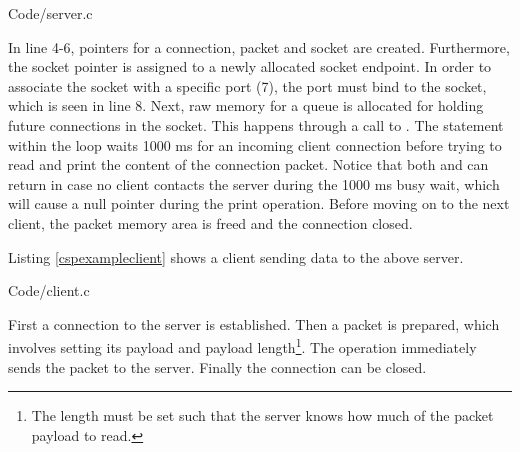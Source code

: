 
{Code/server.c}

In line 4-6, pointers for a connection, packet and socket are created. Furthermore, the socket pointer is assigned to a newly allocated socket endpoint. In order to associate the socket with a specific port (7), the port must bind to the socket, which is seen in line 8. Next, raw memory for a queue is allocated for holding future connections in the socket. This happens through a call to . The  statement within the loop waits 1000 ms for an incoming client connection before trying to read and print the content of the connection packet. Notice that both  and  can return  in case no client contacts the server during the 1000 ms busy wait, which will cause a null pointer during the print operation. Before moving on to the next client, the packet memory area is freed and the connection closed. 

Listing \ref{cspexampleclient} shows a client sending data to the above server.


{Code/client.c}

First a connection to the server is established. Then a packet is prepared, which involves setting its payload and payload length\footnote{The length must be set such that the server knows how much of the packet payload to read.}. The  operation immediately sends the packet to the server. Finally the connection can be closed.
